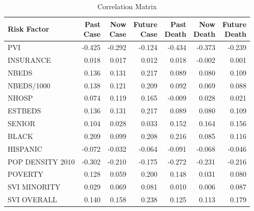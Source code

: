 \documentclass[letterpaper, inpress]{jds} %
\renewcommand{\_}{%
    \textunderscore\hspace{0pt}%
}
\begin{document}
\begin{table}[!h]
\caption{Correlation Matrix}
\bigskip
\label{tab:corr-matrix}
\begin{center}
\begin{tabular}{lrrrrrr}
\toprule
Risk Factor		&
\makecell{Past\\Case} &
\makecell{Now\\Case} &
\makecell{Future\\Case} &
\makecell{Past\\Death} &
\makecell{Now\\Death} &
\makecell{Future\\Death} \\
\midrule
PVI                     & -0.425      & -0.292      & -0.124      & -0.434      & -0.373      & -0.239    \\
INSURANCE               & 0.018       & 0.017       & 0.012       & 0.018       & -0.002      & 0.001     \\
NBEDS                   & 0.136       & 0.131       & 0.217       & 0.089       & 0.080        & 0.109     \\
NBEDS/1000              & 0.138       & 0.121       & 0.209       & 0.092       & 0.069       & 0.088     \\
NHOSP                   & 0.074       & 0.119       & 0.165       & -0.009      & 0.028       & 0.021     \\
ESTBEDS                 & 0.136       & 0.131       & 0.217       & 0.089       & 0.080        & 0.109     \\
SENIOR                  & 0.104       & 0.028       & 0.033       & 0.152       & 0.164       & 0.156     \\
BLACK                   & 0.209       & 0.099       & 0.208       & 0.216       & 0.085       & 0.116     \\
HISPANIC                & -0.072      & -0.032      & -0.064      & -0.091      & -0.068      & -0.046    \\
POP\_DENSITY\_2010      & -0.302      & -0.210      & -0.175      & -0.272      & -0.231      & -0.216    \\
POVERTY                 & 0.128       & 0.059       & 0.200       & 0.148       & 0.031       & 0.080     \\
SVI\_MINORITY           & 0.029       & 0.069       & 0.081       & 0.010        & 0.006       & 0.087     \\
SVI\_OVERALL            & 0.140       & 0.158       & 0.238       & 0.125       & 0.113       & 0.179     \\

\end{tabular}
\end{center}
\end{table}
\end{document}
